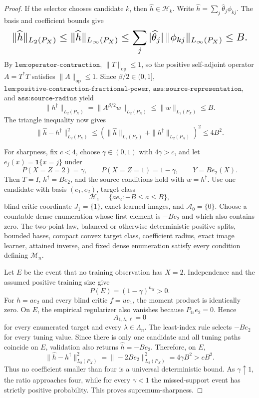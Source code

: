 \documentclass{article}
\begin{document}
\begin{proof}
If the selector chooses candidate \(k\), then \(\widehat h\in\mathcal H_k\). Write \(\widehat h=\sum_j\widehat\theta_j\phi_{kj}\). The basis and coefficient bounds give
\[
\makebox[\linewidth][c]{\resizebox{0.98\linewidth}{!}{\(\displaystyle \|\widehat h\|_{L_2(P_X)}
 \le\|\widehat h\|_{L_\infty(P_X)}
 \le\sum_j|\widehat\theta_j|\,\|\phi_{kj}\|_{L_\infty(P_X)}
 \le B.\)}}
\]
By \(\texttt{lem:operator-contraction}\), \(\|T\|_{\mathrm{op}}\le1\), so the positive self-adjoint operator \(A=T^*T\) satisfies \(\|A\|_{\mathrm{op}}\le1\). Since \(\beta/2\in(0,1]\), \(\texttt{lem:positive-contraction-fractional-power}\), \(\texttt{ass:source-representation}\), and \(\texttt{ass:source-radius}\) yield
\[
 \|h^\dagger\|_{L_2(P_X)}
 =\|A^{\beta/2}w\|_{L_2(P_X)}
 \le\|w\|_{L_2(P_X)}
 \le B.
\]
The triangle inequality now gives
\[
 \|\widehat h-h^\dagger\|_{L_2(P_X)}^2
 \le(\|\widehat h\|_{L_2(P_X)}+\|h^\dagger\|_{L_2(P_X)})^2
 \le4B^2.
\]

For sharpness, fix \(c<4\), choose \(\gamma\in(0,1)\) with \(4\gamma>c\), and let \(e_j(x)=\mathbf 1\{x=j\}\) under
\[
 P(X=Z=2)=\gamma,
 \qquad
 P(X=Z=1)=1-\gamma,
 \qquad
 Y=B e_2(X).
\]
Then \(T=I\), \(h^\dagger=B e_2\), and the source conditions hold with \(w=h^\dagger\). Use one candidate with basis \((e_1,e_2)\), target class
\[
 \mathcal H_1=\{a e_2:-B\le a\le B\},
\]
blind critic coordinate \(J_1=\{1\}\), exact learned images, and \(\mathcal A_0=\{0\}\). Choose a countable dense enumeration whose first element is \(-B e_2\) and which also contains zero. The two-point law, balanced or otherwise deterministic positive splits, bounded bases, compact convex target class, coefficient radius, exact image learner, attained inverse, and fixed dense enumeration satisfy every condition defining \(\mathcal M_n\).

Let \(E\) be the event that no training observation has \(X=2\). Independence and the assumed positive training size give
\[
 P(E)=(1-\gamma)^{n_{\mathrm{tr}}}>0.
\]
For \(h=a e_2\) and every blind critic \(f=u e_1\), the moment product is identically zero. On \(E\), the empirical regularizer also vanishes because \(P_{\mathrm{tr}}e_2=0\). Hence
\[
 A_{1,\lambda,\ell}=0
\]
for every enumerated target and every \(\lambda\in\Lambda_n\). The least-index rule selects \(-B e_2\) for every tuning value. Since there is only one candidate and all tuning paths coincide on \(E\), validation also returns \(\widehat h=-B e_2\). Therefore, on \(E\),
\[
 \|\widehat h-h^\dagger\|_{L_2(P_X)}^2
 =\|-2B e_2\|_{L_2(P_X)}^2
 =4\gamma B^2
 >cB^2.
\]
Thus no coefficient smaller than four is a universal deterministic bound. As \(\gamma\uparrow1\), the ratio approaches four, while for every \(\gamma<1\) the missed-support event has strictly positive probability. This proves supremum-sharpness.
\end{proof}
\end{document}
